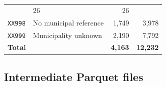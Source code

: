 \documentclass[3p]{elsarticle}
\begin{document}
\begin{table}[ht]
\begin{tabular}{llrr}
                     & 26 & 26 \\
      \texttt{XX998} & No municipal reference                                                                                                                                                 
                     & 1{,}749 & 3{,}978 \\                                                                                                                                                 
      \texttt{XX999} & Municipality unknown                                                                                                                                                   
                     & 2{,}190 & 7{,}792 \\
      \midrule                                                                                                                                                                                
      \textbf{Total} & & \textbf{4{,}163} & \textbf{12{,}232} \\                                                                                                                            
      \bottomrule                                                                                                                                                                             
    \end{tabular}
  \end{table}                                                                                                                                                                                 
                                                                                                                                                                                            
  \subsection*{Intermediate Parquet files}                                                                                                                                                  
\end{document}
